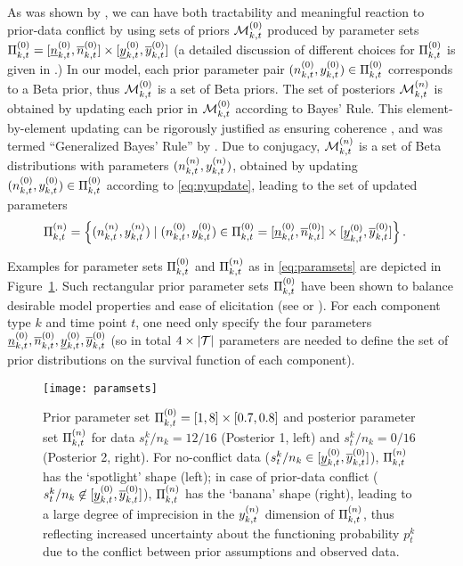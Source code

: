 \documentclass[12pt, a4paper]{elsarticle}
\begin{document}
As was shown by \citet{2009:WalterAugustin}, %
we can have both tractability and meaningful reaction to prior-data conflict
by using sets of priors $\mathcal{M}^{(0)}_{k,t}$ produced by parameter sets $\Pi^{(0)}_{k,t} = [\underline{n}^{(0)}_{k,t}, \overline{n}^{(0)}_{k,t}] \times [\underline{y}^{(0)}_{k,t}, \overline{y}^{(0)}_{k,t}]$
(a detailed discussion of different choices for $\Pi^{(0)}_{k,t}$ is given in \citet[\S 3.1]{2013:diss-gw}.)
In our model, each prior parameter pair $(n^{(0)}_{k,t}, y^{(0)}_{k,t}) \in \Pi^{(0)}_{k,t}$
corresponds to a Beta prior, thus $\mathcal{M}^{(0)}_{k,t}$ is a set of Beta priors.
The set of posteriors $\mathcal{M}^{(n)}_{k,t}$ is obtained by updating each prior in $\mathcal{M}^{(0)}_{k,t}$ according to Bayes' Rule.
This element-by-element updating can be rigorously justified
as ensuring coherence \citep[\S 2.5]{1991:walley}, and was termed ``Generalized Bayes' Rule'' by \citet[\S 6.4]{1991:walley}.
Due to conjugacy, $\mathcal{M}^{(n)}_{k,t}$ is a set of Beta distributions with parameters $(n^{(n)}_{k,t}, y^{(n)}_{k,t})$,
obtained by updating $(n^{(0)}_{k,t}, y^{(0)}_{k,t}) \in \Pi^{(0)}_{k,t}$ according to \eqref{eq:nyupdate},
leading to the set of updated parameters
\begin{align}
\Pi^{(n)}_{k,t} &= \Big\{ (n^{(n)}_{k,t}, y^{(n)}_{k,t}) \mid (n^{(0)}_{k,t}, y^{(0)}_{k,t}) \in \Pi^{(0)}_{k,t} = [\underline{n}^{(0)}_{k,t}, \overline{n}^{(0)}_{k,t}] \times [\underline{y}^{(0)}_{k,t}, \overline{y}^{(0)}_{k,t}] \Big\}\,.
\label{eq:paramsets}
\end{align}

Examples for parameter sets $\Pi^{(0)}_{k,t}$ and $\Pi^{(n)}_{k,t}$ as in \eqref{eq:paramsets} are depicted in Figure~\ref{fig:paramsets}.
Such rectangular prior parameter sets $\Pi^{(0)}_{k,t}$ have been shown
to balance desirable model properties and ease of elicitation 
(see \citet[pp.~123f]{2013:diss-gw} or \citet{Troffaes2013a-short}).
%
For each component type $k$ and time point $t$,
one need only specify the four parameters $\underline{n}^{(0)}_{k,t}, \overline{n}^{(0)}_{k,t}, \underline{y}^{(0)}_{k,t}, \overline{y}^{(0)}_{k,t}$
(so in total $4 \times |{\cal T}|$ parameters are needed to define the set of prior distributions
on the survival function of each component).

\begin{figure}
\texttt{[image: paramsets]}
\caption{Prior parameter set $\Pi^{(0)}_{k,t} = [1,8] \times [0.7,0.8]$ and posterior parameter set $\Pi^{(n)}_{k,t}$
for data $s^k_t/n_k = 12/16$ (Posterior 1, left) and $s^k_t/n_k = 0/16$ (Posterior 2, right).
For no-conflict data ($s^k_t/n_k \in [\underline{y}^{(0)}_{k,t},\overline{y}^{(0)}_{k,t}]$), $\Pi^{(n)}_{k,t}$ has the `spotlight' shape (left);
in case of prior-data conflict ($s^k_t/n_k \not\in [\underline{y}^{(0)}_{k,t},\overline{y}^{(0)}_{k,t}]$), $\Pi^{(n)}_{k,t}$ has the `banana' shape (right),
leading to a large degree of imprecision in the $y^{(n)}_{k,t}$ dimension of $\Pi^{(n)}_{k,t}$,
thus reflecting increased uncertainty about the functioning probability $p^k_t$
due to the conflict between prior assumptions and observed data.}
\label{fig:paramsets}
\end{figure}
\end{document}
